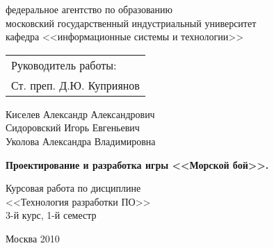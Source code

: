 ﻿\thispagestyle{empty}

\vspace*{-\headheight}\vspace*{-\headsep}

{\centering
{\sc
федеральное агентство по образованию\\
московский государственный индустриальный университет\\
кафедра <<информационные системы и технологии>>\\
}


\vspace{4cm plus 1mm minus 1mm}

\begin{flushright}
\begin{tabular}{l}
Руководитель работы:\\
Ст. преп. Д.Ю. Куприянов
\end{tabular}
\end{flushright}

\vspace{3cm plus 1mm minus 1mm}

Киселев Александр Александрович\\
Сидоровский Игорь Евгеньевич\\
Уколова Александра Владимировна

\vspace{1cm plus 1mm minus 1mm}
{\large\bf
Проектирование и разработка игры <<Морской бой>>.
}

\vspace{1cm plus 1mm minus 1mm}

Курсовая работа по дисциплине\\
<<Технология разработки ПО>>\\
3-й курс, 1-й семестр

\vfill

Москва 2010

}

\newpage
\endinput


